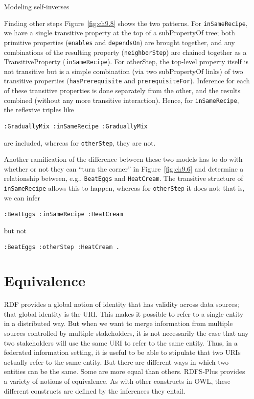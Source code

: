 \begin{challenge}{Modeling self-inverses}
\begin{challenge}{Finding other steps}
Figure~\ref{fig:ch9.8} shows the two patterns. For \texttt{inSameRecipe}, we have a single
transitive property at the top of a subPropertyOf tree; both primitive
properties (\texttt{enables} and \texttt{dependsOn}) are brought together, and any
combinations of the resulting property (\texttt{neighborStep}) are chained
together as a TransitiveProperty (\texttt{inSameRecipe}). For otherStep, the
top-level property itself is not transitive but is a simple combination
(via two subPropertyOf links) of two transitive properties
(\texttt{hasPrerequisite} and \texttt{prerequisiteFor}). Inference for each of these
transitive properties is done separately from the other, and the results
combined (without any more transitive interaction). Hence, for
\texttt{inSameRecipe}, the reflexive triples like

\begin{lstlisting}
:GraduallyMix :inSameRecipe :GraduallyMix
\end{lstlisting}

are included, whereas for \texttt{otherStep}, they are not.

Another ramification of the difference between these two models has to
do with whether or not they can ``turn the corner'' in Figure~\ref{fig:ch9.6} and
determine a relationship between, e.g., \texttt{BeatEggs} and \texttt{HeatCream}. The
transitive structure of \texttt{inSameRecipe} allows this to happen, whereas for
\texttt{otherStep} it does not; that is, we can infer


\begin{lstlisting}
:BeatEggs :inSameRecipe :HeatCream
\end{lstlisting}
but not
\begin{lstlisting}
:BeatEggs :otherStep :HeatCream .
\end{lstlisting}
\end{challenge}

\section{Equivalence}
\label{section:Equivalence}
RDF provides a global notion of identity that has validity across data
sources; that global identity is the URI. This makes it possible to
refer to a single entity in a distributed way. But when we want to merge
information from multiple sources controlled by multiple stakeholders,
it is not necessarily the case that any two stakeholders will use the
same URI to refer to the same entity. Thus, in a federated information
setting, it is useful to be able to stipulate that two URIs actually
refer to the same entity. But there are different ways in which two
entities can be the same. Some are more equal than others. RDFS-Plus
provides a variety of notions of equivalence. As with other constructs
in OWL, these different constructs are defined by the inferences they
entail.


\end{challenge}
